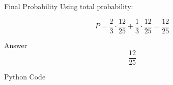 \documentclass{beamer}
\begin{document}
\begin{frame}{Final Probability}
Using total probability:

\[
P = \frac{2}{3}\cdot \frac{12}{25} + \frac{1}{3}\cdot \frac{12}{25}
= \frac{12}{25}
\]

\begin{block}{Answer}
\[
\boxed{\frac{12}{25}}
\]
\end{block}

\end{frame}
\begin{frame}[fragile]{Python Code}
\end{frame}
\end{document}
